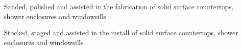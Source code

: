 \begin{job}

  \begin{accomplishments}
    \item Sanded, polished and assisted in the fabrication of solid surface
    countertops, shower enclosures and windowsills
    \item Stocked, staged and assisted in the install of solid surface
    countertops, shower enclosures and windowsills
  \end{accomplishments}
\end{job}
